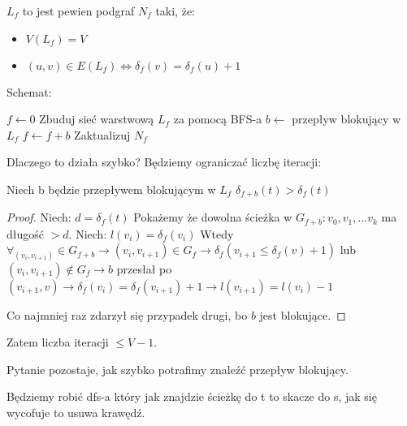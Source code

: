 \begin{defi}
    $L_f$ to jest pewien podgraf $N_f$ taki, że:
    \begin{itemize}
        \item $V(L_f) = V$ 
        \item $(u,v) \in E(L_f) \iff \delta_f(v)=\delta_f(u) + 1$
    \end{itemize}
\end{defi}

Schemat:

\begin{algorithmic}
    \State $f \gets 0$
        \State Zbuduj sieć warstwową $L_f$ za pomocą BFS-a
        \State $b \gets $ przepływ blokujący w $L_f$
        \State $f \gets f + b$
        \State Zaktualizuj $N_f$
        \EndWhile
\end{algorithmic}

Dlaczego to działa szybko? Będziemy ograniczać liczbę iteracji:

\begin{lemat}
    Niech b będzie przepływem blokującym w $L_f$
    $\delta_{f+b}(t) > \delta_f(t)$
\end{lemat}

\begin{proof}
    Niech: $d = \delta_f(t)$ \newline
    Pokażemy że dowolna ścieżka w $G_{f+b}: v_0, v_1, ... v_k$ ma długość $> d$. \newline
    Niech: $l(v_i) = \delta_f(v_i)$ \newline
    Wtedy $\forall_{(v_i,v_{i+1})} \in G_{f+b} \rightarrow (v_i,v_{i+1}) \in G_f \rightarrow \delta_f(v_{i+1} \le \delta_f(v)+1)$
    lub $(v_i,v_{i+1}) \notin G_f \rightarrow b$ przesłał po $(v_{i+1}, v) \rightarrow \delta_f(v_i) = \delta_f(v_{i+1}) + 1 \rightarrow l(v_{i+1}) = l(v_i) -1$

    Co najmniej raz zdarzył się przypadek drugi, bo $b$ jest blokujące.

\end{proof}

Zatem liczba iteracji $\le V-1$.


Pytanie pozostaje, jak szybko potrafimy znaleźć przepływ blokujący.

Będziemy robić dfs-a który jak znajdzie ścieżkę do t to skacze do s, jak się wycofuje to usuwa krawędź.

